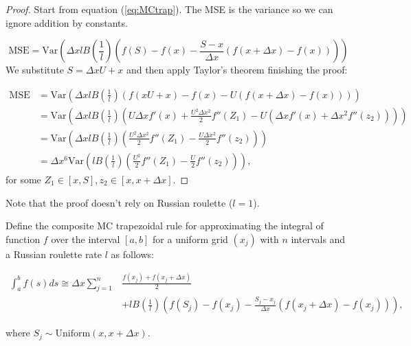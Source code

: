\documentclass[a4paper,12pt]{article}
\begin{document}
\begin{proof}
    Start from equation (\ref{eq:MCtrap}). The MSE is the variance
    so we can ignore addition by constants.

    \begin{equation}
        \text{MSE} = \text{Var}\left( \Delta x l B\left( \frac{1}{l}\right)
        \left(f(S) - f(x) - \frac{S - x}{\Delta x}
        \left(f(x+\Delta x) - f(x)\right) \right)\right)
    \end{equation}
    We substitute $S = \Delta x U + x$ and then apply Taylor's theorem
    finishing the proof:

    \begin{align}
        \text{MSE} & = \text{Var}\left( \Delta x l B\left( \frac{1}{l}\right)
        \left(f(xU+x) - f(x) - U
        \left(f(x+\Delta x) - f(x)\right) \right)\right)                           \\
                   & = \text{Var}\left( \Delta x l B\left( \frac{1}{l}\right)
        \left( U \Delta x f'(x)+ \frac{U^{2} \Delta x ^{2}}{2} f''(Z_{1})
        - U \left( \Delta x f'(x) +
        \Delta x ^{2} f''(z_{2})\right) \right)\right)                             \\
                   & = \text{Var}\left( \Delta x l B\left( \frac{1}{l}\right)
        \left( \frac{U^{2} \Delta x ^{2}}{2} f''(Z_{1})
        -  \frac{U\Delta x ^{2}}{2} f''(z_{2}) \right)\right)                      \\
                   & =\Delta x ^{6} \text{Var}\left(  l B\left( \frac{1}{l}\right)
        \left( \frac{U^{2} }{2} f''(Z_{1})
        -  \frac{U}{2} f''(z_{2}) \right)\right),
    \end{align}
    for some $Z_{1} \in [x,S], z_{2} \in [x,x+\Delta x]$.
\end{proof}
Note that the proof doesn't rely on Russian roulette ($l=1$).


\begin{definition} \label{MCtrap}
    Define the composite MC trapezoidal rule for approximating the integral
    of function $f$ over the interval $[a, b]$ for a uniform grid $(x_{j})$ with $n$
    intervals and a Russian roulette rate $l$ as follows:

    \begin{align} \label{eq:cMCtrap}
        \int_{a}^{b} f(s) ds \cong \Delta x \sum_{j=1}^{n} & \frac{f(x_{j}) + f(x_{j}+\Delta x)}{2} \nonumber \\
                                                           & + l B\left(\frac{1}{l}\right)
        \left(f(S_j) - f(x_{j}) - \frac{S_j - x_{j}}{\Delta x}(f(x_{j}+\Delta x) - f(x_{j}))\right),
    \end{align}

    where $S_j \sim \text{Uniform}(x,x+\Delta x)$.

\end{definition}
\end{document}
